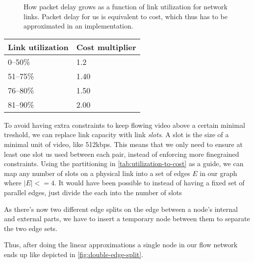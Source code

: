 \begin{figure}
    \centering
    \caption{How packet delay grows as a function of link utilization for network links. Packet delay for us is equivalent to cost, which thus has to be approximated in an implementation.}
    \label{fig:utility-latency}
\end{figure}


\begin{center}
    \label{tab:utilization-to-cost}
    \begin{tabular}{| l | l |}
    \hline
    \textbf{Link utilization} & \textbf{Cost multiplier} \\ \hline
    0--50\% & 1.2 \\ \hline
    51--75\% & 1.40 \\ \hline
    76--80\% & 1.50 \\ \hline
    81--90\% & 2.00 \\ \hline
    \end{tabular}
\end{center}

To avoid having extra constraints to keep flowing video above a certain minimal treshold, we can replace link capacity with link \emph{slots}. A slot is the size of a minimal unit of video, like 512kbps. This means that we only need to ensure at least one slot us used between each pair, instead of enforcing more finegrained constraints. Using the partitioning in \autoref{tab:utilization-to-cost} as a guide, we can map any number of slots on a physical link into a set of edges $E$ in our graph where $|E| <= 4$. It would have been possible to instead of having a fixed set of parallel edges, just divide the each into the number of slots

As there's now two different edge splits on the edge between a node's internal and external parts, we have to insert a temporary node between them to separate the two edge sets.

Thus, after doing the linear approximations a single node in our flow network ends up like depicted in \autoref{fig:double-edge-split}.


